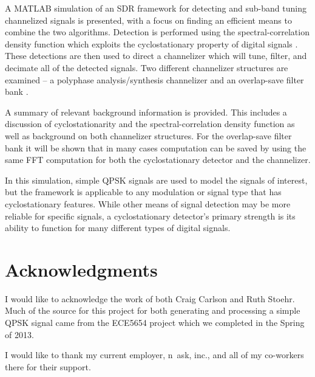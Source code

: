 \documentclass[12pt]{report}
\begin{document}
A MATLAB simulation of an SDR framework for detecting and sub-band tuning
channelized signals is presented, with a focus on finding an efficient means to
combine the two algorithms. Detection is performed using the
spectral-correlation density function which exploits the cyclostationary
property of digital signals \cite{Gardner1}.  These detections are then used to
direct a channelizer which will tune, filter, and decimate all of the detected
signals. Two different channelizer structures are examined – a polyphase
analysis/synthesis channelizer \cite{Harris1} and an overlap-save filter bank
\cite{Borgerding1}.

A summary of relevant background information is provided.  This includes
a discussion of cyclostationarity and the spectral-correlation density function
as well as background on both channelizer structures. For the overlap-save
filter bank it will be shown that in many cases computation can be saved by
using the same FFT computation for both the cyclostationary detector and the
channelizer.

In this simulation, simple QPSK signals are used to model the signals of
interest, but the framework is applicable to any modulation or signal type that
has cyclostationary features. While other means of signal detection may be more
reliable for specific signals, a cyclostationary detector's primary strength is
its ability to function for many different types of digital signals.


\vfill



\pagebreak

\chapter*{Acknowledgments}
I would like to acknowledge the work of both Craig Carlson and Ruth Stoehr.
Much of the source for this project for both generating and processing a simple
QPSK signal came from the ECE5654 project which we completed in the Spring of
2013.

I would like to thank my current employer, n~ask, inc., and all of my
co-workers there for their support.
\end{document}
